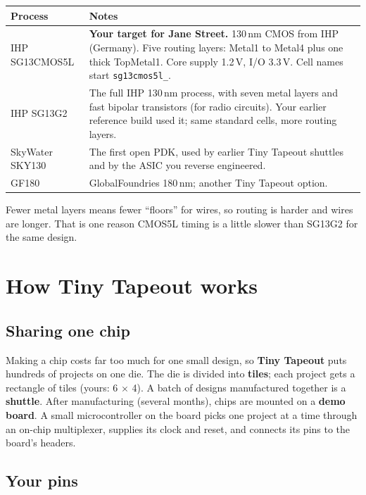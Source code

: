 \documentclass[11pt,a4paper]{article}
\begin{document}
\begin{center}
\begin{tabularx}{\linewidth}{@{}lX@{}}
\toprule
Process & Notes \\
\midrule
IHP SG13CMOS5L & \textbf{Your target for Jane Street.} 130\,nm CMOS from IHP (Germany). Five routing layers: Metal1 to Metal4 plus one thick TopMetal1. Core supply 1.2\,V, I/O 3.3\,V. Cell names start \texttt{sg13cmos5l\_}. \\
IHP SG13G2 & The full IHP 130\,nm process, with seven metal layers and fast bipolar transistors (for radio circuits). Your earlier reference build used it; same standard cells, more routing layers. \\
SkyWater SKY130 & The first open PDK, used by earlier Tiny Tapeout shuttles and by the ASIC you reverse engineered. \\
GF180 & GlobalFoundries 180\,nm; another Tiny Tapeout option. \\
\bottomrule
\end{tabularx}
\end{center}

Fewer metal layers means fewer ``floors'' for wires, so routing is harder and wires are longer. That is one reason CMOS5L timing is a little slower than SG13G2 for the same design.

\section{How Tiny Tapeout works}

\subsection{Sharing one chip}

Making a chip costs far too much for one small design, so \textbf{Tiny Tapeout} puts hundreds of projects on one die. The die is divided into \textbf{tiles}; each project gets a rectangle of tiles (yours: 6 $\times$ 4). A batch of designs manufactured together is a \textbf{shuttle}. After manufacturing (several months), chips are mounted on a \textbf{demo board}. A small microcontroller on the board picks one project at a time through an on-chip multiplexer, supplies its clock and reset, and connects its pins to the board's headers.

\subsection{Your pins}
\end{document}
